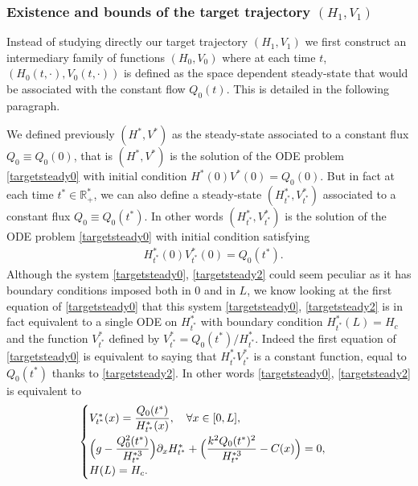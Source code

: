 \documentclass[11pt]{article}
\numberwithin{equation}{section}
\theoremstyle{definition}
\begin{document}
\subsubsection*{Existence and bounds of the target trajectory $(H_{1},V_{1})$}

Instead of studying directly our target trajectory $(H_{1},V_{1})$ we first construct an intermediary family of functions
$(H_{0},V_{0})$ where at each time $t$, $(H_{0}(t,\cdot),V_{0}(t,\cdot))$ is defined as the space dependent steady-state that would be associated with the constant flow $Q_{0}(t)$. This is detailed in the following paragraph.

We defined previously $(H^{*}, V^{*})$ as the steady-state associated to a constant flux $Q_{0}\equiv Q_{0}(0)$, {that is} $(H^{*},V^{*})$ is the solution of the ODE problem \eqref{targetsteady0} with
initial condition $H^{*}(0)V^{*}(0)=Q_{0}(0)$. But in fact
at each time $t^{*}\in\mathbb{R}^{*}_{+}$, we can also define a steady-state $(H^{*}_{t^{*}},V^{*}_{t^{*}})$ associated to a constant flux $Q_{0}\equiv Q_{0}(t^{*})$. {In other words}
$(H^{*}_{t^{*}},V^{*}_{t^{*}})$ is the solution of the ODE problem \eqref{targetsteady0}
with initial condition satisfying
\begin{equation}
\begin{split}
&H_{t^{*}}^{*}(0)V_{t^{*}}^{*}(0)=Q_{0}(t^{*}).
\end{split}
\label{targetsteady2}
\end{equation}
Although the system \eqref{targetsteady0}, \eqref{targetsteady2} could seem peculiar as it has boundary conditions imposed both in $0$ and in $L$,
we know looking at the first equation of \eqref{targetsteady0} that this system \eqref{targetsteady0}, \eqref{targetsteady2} is in fact equivalent to a single ODE on $H_{t^{*}}^{*}$
with boundary condition $H_{t^{*}}^{*}(L)=H_{c}$ and the function $V_{t^{*}}^{*}$ defined by $V_{t^{*}}^{*}=Q_{0}(t^{*})/H_{t^{*}}^{*}$. Indeed the first equation of \eqref{targetsteady0} is equivalent to saying that $H_{t^{*}}^{*}V_{t^{*}}^{*}$ is a constant function, equal to $Q_{0}(t^{*})$ thanks to \eqref{targetsteady2}. In other words \eqref{targetsteady0}, \eqref{targetsteady2} is equivalent to
\begin{equation*}
\begin{cases}
V_{t^{*}}^{*}(x)=\dfrac{Q_{0}(t^{*})}{H_{t^{*}}^{*}(x)},\quad\forall x\in[0,L],\\[8pt]
\Bigl(g-\dfrac{Q_{0}^{2}(t^{*})}{H_{t^{*}}^{*3}} \Bigr)\partial_{x}H_{t^{*}}^{*}+ \Bigl(\dfrac{k^{2}Q_{0}(t^{*})^{2}}{H_{t^{*}}^{*3}}-C(x) \Bigr)=0,\\[5pt]
H(L)=H_{c}.
\end{cases}
\end{equation*}
\end{document}
